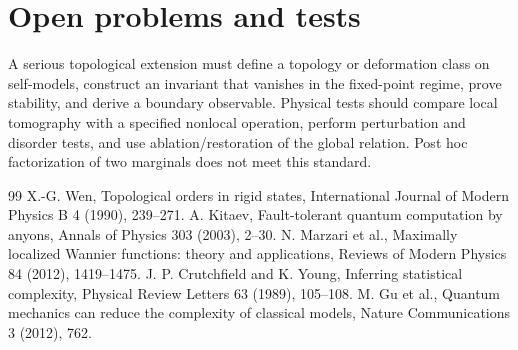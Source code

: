 \documentclass[11pt,a4paper]{article}
\begin{document}
\section{Open problems and tests}
A serious topological extension must define a topology or deformation class on self-models, construct an invariant that vanishes in the fixed-point regime, prove stability, and derive a boundary observable. Physical tests should compare local tomography with a specified nonlocal operation, perform perturbation and disorder tests, and use ablation/restoration of the global relation. Post hoc factorization of two marginals does not meet this standard.

\begin{thebibliography}{99}
 X.-G. Wen, Topological orders in rigid states, International Journal of Modern Physics B 4 (1990), 239--271.
 A. Kitaev, Fault-tolerant quantum computation by anyons, Annals of Physics 303 (2003), 2--30.
 N. Marzari et al., Maximally localized Wannier functions: theory and applications, Reviews of Modern Physics 84 (2012), 1419--1475.
 J. P. Crutchfield and K. Young, Inferring statistical complexity, Physical Review Letters 63 (1989), 105--108.
 M. Gu et al., Quantum mechanics can reduce the complexity of classical models, Nature Communications 3 (2012), 762.
\end{thebibliography}
\end{document}
